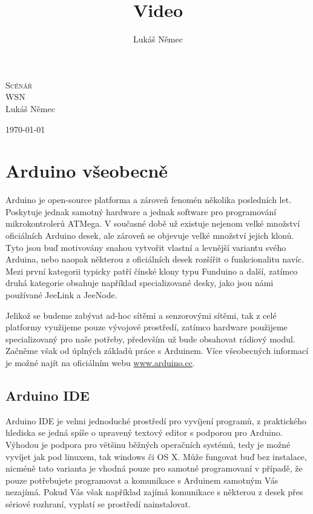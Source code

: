 \documentclass[12pt,titlepage]{article}
\title{Video}
\author{Lukáš Němec}
\begin{document}
\begin{titlepage}
\begin{center}
\textsc{\LARGE Scénář}\\[1cm]
\textsc{\Large WSN}\\[0.6cm]


\Large{Lukáš Němec}\\[1cm]

\bigskip
\bigskip

\Large{\today}
\end{center}
\end{titlepage}



\tableofcontents
\newpage


\section{Arduino všeobecně}
Arduino je open-source platforma a zároveň fenomén několika posledních let. Poskytuje jednak samotný hardware a jednak software pro programování mikrokontrolerů ATMega. V současné době už existuje nejenom velké množství oficiálních Arduino desek, ale zároveň se objevuje velké množství jejich klonů. Tyto jsou buď motivovány snahou vytvořit vlastní a levnější variantu svého Arduina, nebo naopak některou z oficiálních desek rozšířit o funkcionalitu navíc. Mezi první kategorii typicky patří čínské klony typu Funduino a další, zatímco druhá kategorie obsahuje například specializované desky, jako jsou námi používané JeeLink a JeeNode.

Jelikož se budeme zabývat ad-hoc sítěmi a senzorovými sítěmi, tak z celé platformy využijeme pouze vývojové prostředí, zatímco hardware použijeme specializovaný pro naše potřeby, především už bude obsahovat rádiový modul. Začněme však od úplných základů práce s Arduinem. Více všeobecných informací je možné najít na oficiálním webu 
\url{www.arduino.cc}.

	\subsection{Arduino IDE}
	Arduino IDE je velmi jednoduché prostředí pro vyvíjení programů, z praktického hlediska se jedná spíše o upravený textový editor s podporou pro Arduino. 
	Výhodou je podpora pro většinu běžných operačních systémů, tedy je možné vyvíjet jak pod linuxem, tak windows či OS X. Může fungovat buď bez instalace, nicméně tato varianta je vhodná pouze pro samotné programovaní v případě, že pouze potřebujete programovat a komunikace s Arduinem samotným Vás nezajímá. Pokud Vás však například zajímá komunikace s některou z desek přes sériové rozhraní, vyplatí se prostředí nainstalovat.
	
\end{document}
